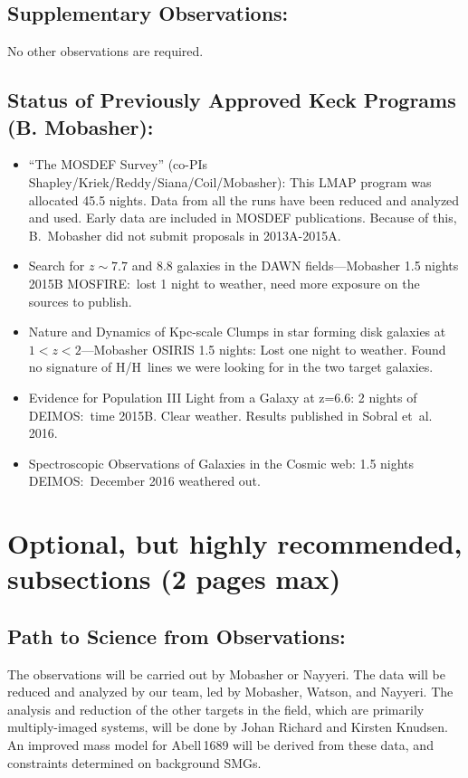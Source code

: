 \documentclass[letter,12pt]{article}
\begin{document}
\subsection{Supplementary Observations:}
No other observations are required.

\subsection{Status of Previously Approved Keck Programs (B. Mobasher):}
\begin{itemize}
  \item ``The MOSDEF Survey'' (co-PIs Shapley/Kriek/Reddy/Siana/Coil/Mobasher):
        This LMAP program was allocated 45.5 nights. Data from all the runs have
        been reduced and analyzed and used. Early data are included in MOSDEF
        publications. Because of this, B.~Mobasher did not submit proposals in
        2013A-2015A.
  \item Search for \(z\sim7.7\) and 8.8 galaxies in the DAWN fields---Mobasher 1.5
        nights 2015B MOSFIRE:\ lost 1 night to weather, need more exposure on the
        sources to publish.
  \item	Nature and Dynamics of Kpc-scale Clumps in star forming disk galaxies at
        \(1 < z < 2\)---Mobasher OSIRIS 1.5 nights: Lost one night to weather.
        Found no signature of H\textalpha/H\textbeta\ lines we were looking for
        in the two target galaxies.
  \item	Evidence for Population III Light from a Galaxy at z=6.6: 2 nights of
        DEIMOS:\ time 2015B. Clear weather. Results published in Sobral et~al.
        2016.
  \item	Spectroscopic Observations of Galaxies in the Cosmic web: 1.5 nights
        DEIMOS:\ December 2016 weathered out.
\end{itemize}

\clearpage

\section{Optional, but highly recommended, subsections (2 pages max)}

\subsection{Path to Science from Observations:}

The observations will be carried out by Mobasher or Nayyeri. The data will be
reduced and analyzed by our team, led by Mobasher, Watson, and Nayyeri. The
analysis and reduction of the other targets in the field, which are primarily
multiply-imaged systems, will be done by Johan Richard and Kirsten Knudsen. An
improved mass model for Abell\,1689 will be derived from these data, and
constraints determined on background SMGs.
\end{document}
